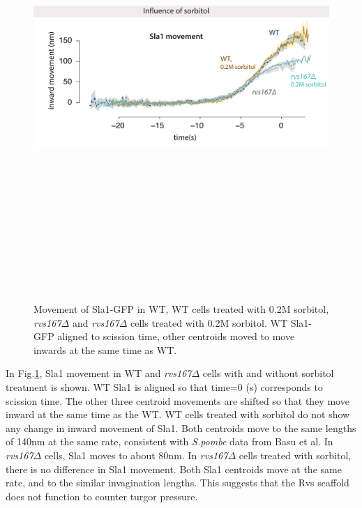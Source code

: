 	
		\begin{figure}[H]
		\centering
		\includegraphics[width=15cm,height=17cm,keepaspectratio]{figures/results_final/sorbitol2}
		\caption[Effect of sorbitol on \textit{rvs167$\Delta$} cells]
		{Movement of Sla1-GFP in WT, WT cells treated with 0.2M sorbitol, \textit{rvs167$\Delta$} and \textit{rvs167$\Delta$} cells treated with 0.2M sorbitol. WT Sla1-GFP aligned to scission time, other centroids moved to move inwards at the same time as WT.
			\label{fig_sorbitol}}
		
	\end{figure}

In Fig.\ref{fig_sorbitol}, Sla1 movement in WT and \textit{rvs167$\Delta$} cells with and without sorbitol treatment is shown. WT Sla1 is aligned so that time=0 (s) corresponds to scission time. The other three centroid movements are shifted so that they move inward at the same time as the WT. WT cells treated with sorbitol do not show any change in inward movement of Sla1. Both centroids move to the same lengths of 140nm at the same rate, consistent with \textit{S.pombe} data from Basu et al. In \textit{rvs167$\Delta$} cells, Sla1 moves to about 80nm. In \textit{rvs167$\Delta$} cells treated with sorbitol, there is no difference in Sla1 movement. Both Sla1 centroids move at the same rate, and to the similar invagination lengths. This suggests that the Rvs scaffold does not function to counter turgor pressure.  



